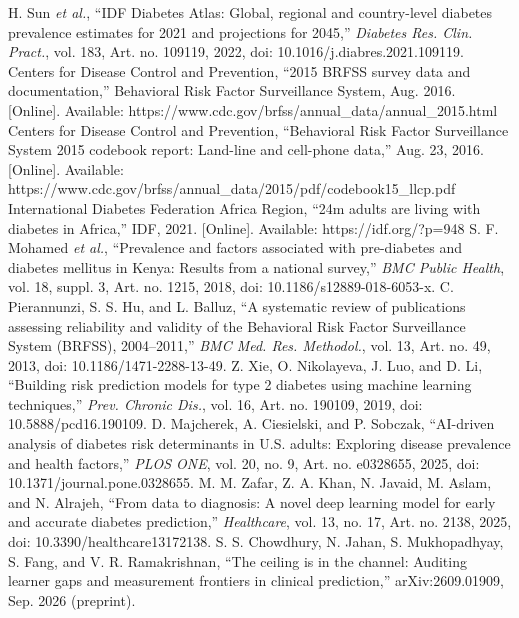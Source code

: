  H. Sun \emph{et al.}, ``IDF Diabetes Atlas: Global, regional and country-level diabetes prevalence estimates for 2021 and projections for 2045,'' \emph{Diabetes Res. Clin. Pract.}, vol. 183, Art. no. 109119, 2022, doi: 10.1016/j.diabres.2021.109119.
 Centers for Disease Control and Prevention, ``2015 BRFSS survey data and documentation,'' Behavioral Risk Factor Surveillance System, Aug. 2016. [Online]. Available: https://www.cdc.gov/brfss/annual\_data/annual\_2015.html
 Centers for Disease Control and Prevention, ``Behavioral Risk Factor Surveillance System 2015 codebook report: Land-line and cell-phone data,'' Aug. 23, 2016. [Online]. Available: https://www.cdc.gov/brfss/annual\_data/2015/pdf/codebook15\_llcp.pdf
 International Diabetes Federation Africa Region, ``24m adults are living with diabetes in Africa,'' IDF, 2021. [Online]. Available: https://idf.org/?p=948
 S. F. Mohamed \emph{et al.}, ``Prevalence and factors associated with pre-diabetes and diabetes mellitus in Kenya: Results from a national survey,'' \emph{BMC Public Health}, vol. 18, suppl. 3, Art. no. 1215, 2018, doi: 10.1186/s12889-018-6053-x.
 C. Pierannunzi, S. S. Hu, and L. Balluz, ``A systematic review of publications assessing reliability and validity of the Behavioral Risk Factor Surveillance System (BRFSS), 2004--2011,'' \emph{BMC Med. Res. Methodol.}, vol. 13, Art. no. 49, 2013, doi: 10.1186/1471-2288-13-49.
 Z. Xie, O. Nikolayeva, J. Luo, and D. Li, ``Building risk prediction models for type 2 diabetes using machine learning techniques,'' \emph{Prev. Chronic Dis.}, vol. 16, Art. no. 190109, 2019, doi: 10.5888/pcd16.190109.
 D. Majcherek, A. Ciesielski, and P. Sobczak, ``AI-driven analysis of diabetes risk determinants in U.S. adults: Exploring disease prevalence and health factors,'' \emph{PLOS ONE}, vol. 20, no. 9, Art. no. e0328655, 2025, doi: 10.1371/journal.pone.0328655.
 M. M. Zafar, Z. A. Khan, N. Javaid, M. Aslam, and N. Alrajeh, ``From data to diagnosis: A novel deep learning model for early and accurate diabetes prediction,'' \emph{Healthcare}, vol. 13, no. 17, Art. no. 2138, 2025, doi: 10.3390/healthcare13172138.
 S. S. Chowdhury, N. Jahan, S. Mukhopadhyay, S. Fang, and V. R. Ramakrishnan, ``The ceiling is in the channel: Auditing learner gaps and measurement frontiers in clinical prediction,'' arXiv:2609.01909, Sep. 2026 (preprint).
